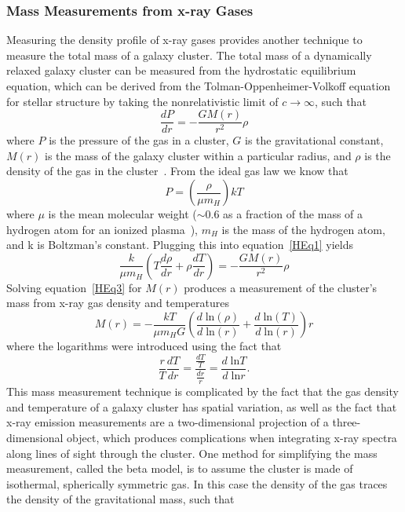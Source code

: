 \subsubsection{Mass Measurements from x-ray Gases}

Measuring the density profile of x-ray gases provides another technique to measure the total mass of a galaxy cluster.  The total mass of a dynamically relaxed galaxy cluster can be measured from the hydrostatic equilibrium equation, which can be derived from the Tolman-Oppenheimer-Volkoff equation for stellar structure by taking the nonrelativistic  limit of $c \rightarrow \infty$, such that 
\begin{equation} \label{HEq1}
\frac{dP}{dr} = -\frac{GM(r)}{r^2}\rho
\end{equation}
where $P$ is the pressure of the gas in a cluster, $G$ is the gravitational constant, $M(r)$ is the mass of the galaxy cluster within a particular radius, and $\rho$ is the density of the gas in the cluster~\cite{EinsteinGrav}.  From the ideal gas law we know that
\begin{equation} \label{HEq2}
P=\left(\frac{\rho}{\mu m_H}\right)kT
\end{equation}
where $\mu$ is the mean molecular weight ($\sim$0.6 as a fraction of the mass of a hydrogen atom for an ionized plasma~\cite{Belyanin}), $m_H$ is the mass of the hydrogen atom, and k is Boltzman's constant.  Plugging this into equation~\ref{HEq1} yields
\begin{equation} \label{HEq3}
\frac{k}{\mu m_H}\left(T\frac{d\rho}{dr} + \rho\frac{dT}{dr} \right)=-\frac{GM(r)}{r^2}\rho
\end{equation}
Solving equation~\ref{HEq3} for $M(r)$ produces a measurement of the cluster's mass from x-ray gas density and temperatures
\begin{equation} \label{HEq4}
M(r) = -\frac{kT}{\mu m_H G}\left(\frac{d \; \text{ln}(\rho)}{d \; \text{ln}(r)} + \frac{d \; \text{ln}(T)}{d \; \text{ln}(r)}\right)r
\end{equation}
where the logarithms were introduced using the fact that 
\begin{equation}
\frac{r}{T}\frac{dT}{dr}=\frac{\frac{dT}{T}}{\frac{dr}{r}}=\frac{ d \; \text{ln}{T}}{d \; \text{ln}{r} }.
\end{equation} 
This mass measurement technique is complicated by the fact that the gas density and temperature of a galaxy cluster has spatial variation, as well as the fact that x-ray emission measurements are a two-dimensional projection of a three-dimensional object, which  produces complications when integrating x-ray spectra along lines of sight through the cluster. One method for simplifying the mass measurement, called the beta model, is to assume the cluster is made of isothermal, spherically symmetric gas.  In this case the density of the gas traces the density of the gravitational mass, such that
